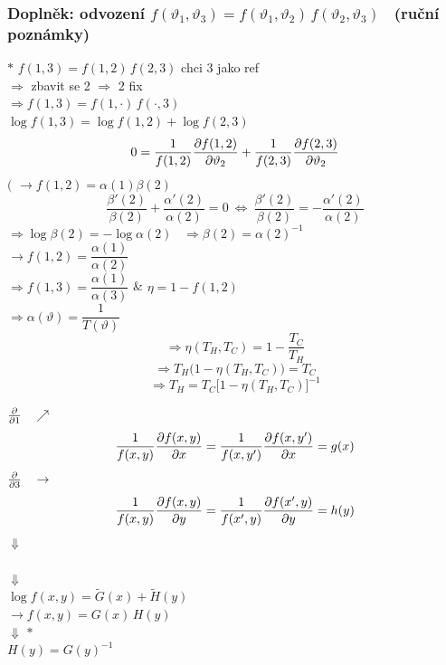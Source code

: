 \subsubsection*{Doplněk: odvození $f(\vartheta_1,\vartheta_3) = f(\vartheta_1,\vartheta_2)\,f(\vartheta_2,\vartheta_3)$ \ {\normalfont\small (ruční poznámky)}}

{\color{NavyBlue}
\begin{minipage}[t]{0.55\textwidth}
\textcircled{$*$} $f(1,3) = f(1,2)\,f(2,3)$ \qquad chci 3 jako ref \\
\hspace*{2em}$\Rightarrow$ zbavit se 2 $\Rightarrow$ 2 fix \\[3pt]
$\Rightarrow f(1,3) = f(1,\cdot)\,f(\cdot,3)$ \\[6pt]
$\log f(1,3) = \log f(1,2) + \log f(2,3)$
\[
  0 = \frac{1}{f(1,2)}\pdv{f(1,2)}{\vartheta_2} + \frac{1}{f(2,3)}\pdv{f(2,3)}{\vartheta_2}
\]
$\Big($ $\to f(1,2) = \alpha(1)\beta(2)$
\[
  \frac{\beta'(2)}{\beta(2)} + \frac{\alpha'(2)}{\alpha(2)} = 0 \ \Leftrightarrow\
  \frac{\beta'(2)}{\beta(2)} = -\frac{\alpha'(2)}{\alpha(2)}
\]
$\Rightarrow \log\beta(2) = -\log\alpha(2)$ \ $\Rightarrow \beta(2) = \alpha(2)^{-1}$ \\[3pt]
$\to f(1,2) = \dfrac{\alpha(1)}{\alpha(2)}$ \\[3pt]
$\Rightarrow f(1,3) = \dfrac{\alpha(1)}{\alpha(3)}$ \quad \& \quad $\eta = 1 - f(1,2)$ \\
\hspace*{3em}$\Rightarrow \alpha(\vartheta) = \dfrac{1}{T(\vartheta)}$
\[
  \Rightarrow \eta(T_H,T_C) = 1 - \frac{T_C}{T_H}
\]
\[
  \Rightarrow T_H\big(1 - \eta(T_H,T_C)\big) = T_C
\]
\[
  \Rightarrow \boxed{T_H = T_C\big[1 - \eta(T_H,T_C)\big]^{-1}}
\]
\end{minipage}
\hfill
\begin{minipage}[t]{0.42\textwidth}
$\pdv{1}$ \ $\nearrow$
\[
  \frac{1}{f(x,y)}\pdv{f(x,y)}{x} = \frac{1}{f(x,y')}\pdv{f(x,y')}{x} = g(x)
\]
$\pdv{3}$ \ $\to$
\[
  \frac{1}{f(x,y)}\pdv{f(x,y)}{y} = \frac{1}{f(x',y)}\pdv{f(x',y)}{y} = h(y)
\]
\centering $\Downarrow$ \\
 \\
$\Downarrow$ \\
$\log f(x,y) = \tilde G(x) + \tilde H(y)$ \\[3pt]
$\to f(x,y) = G(x)\,H(y)$ \\
$\Downarrow$ \textcircled{$*$} \\
$H(y) = G(y)^{-1}$
\end{minipage}
}

